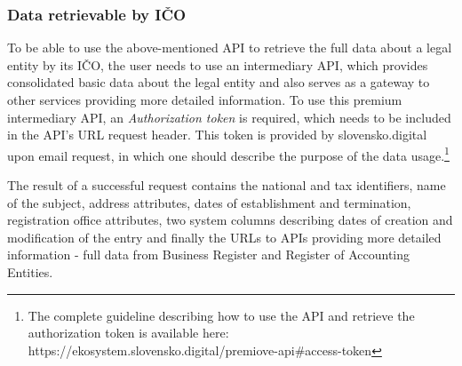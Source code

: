 \documentclass[thesis=B,english]{FITthesis}[2012/06/26]
\begin{document}
	\subsubsection{Data retrievable by IČO}
	To be able to use the above-mentioned API to retrieve the full data about a legal entity by its IČO, the user needs to use an intermediary API, which provides consolidated basic data about the legal entity and also serves as a gateway to other services providing more detailed information. To use this premium intermediary API, an \textit{Authorization token} is required, which needs to be included in the API's URL request header. This token is provided by slovensko.digital upon email request, in which one should describe the purpose of the data usage.\footnote{ The complete guideline describing how to use the API and retrieve the authorization token is available here: https://ekosystem.slovensko.digital/premiove-api\#access-token} 
	
	The result of a successful request contains the national and tax identifiers, name of the subject, address attributes, dates of establishment and termination, registration office attributes, two system columns describing dates of creation and modification of the entry and finally the URLs to APIs providing more detailed information - full data from Business Register and Register of Accounting Entities. 
	
\end{document}

